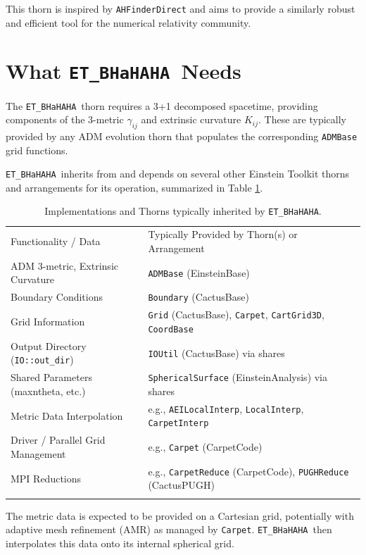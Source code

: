 \documentclass[a4paper,11pt]{article}
\newcommand{\thorn}[1]{{\tt #1}}
\newcommand{\arrangement}[1]{{\sc #1}}
\newcommand{\BHaHAHA}{\thorn{ET\_BHaHAHA}} %
\begin{document}
This thorn is inspired by \thorn{AHFinderDirect} \cite{Thornburg04AHF, Thornburg07LR} and aims to provide a similarly robust and efficient tool for the numerical relativity community.

\section{What \BHaHAHA\ Needs}
\label{sec:needs}

The \BHaHAHA\ thorn requires a 3+1 decomposed spacetime, providing components of the 3-metric $\gamma_{ij}$ and extrinsic curvature $K_{ij}$. These are typically provided by any ADM evolution thorn that populates the corresponding \thorn{ADMBase} grid functions.

\BHaHAHA\ inherits from and depends on several other Einstein Toolkit thorns and arrangements for its operation, summarized in Table \ref{tab:inherits_needs}.
\begin{table}[htbp]
\centering
\caption[Thorns and capabilities typically required by \BHaHAHA.]
         {Implementations and Thorns typically inherited by \BHaHAHA.}
\label{tab:inherits_needs}
\vspace{0.5em}
\begin{tabular}{ll}
\hfill
Functionality / Data           & Typically Provided by Thorn(s) or Arrangement \\
\hfill
ADM 3-metric, Extrinsic Curvature & \thorn{ADMBase} (\arrangement{EinsteinBase}) \\
Boundary Conditions                & \thorn{Boundary} (\arrangement{CactusBase}) \\
Grid Information                   & \thorn{Grid} (\arrangement{CactusBase}), \thorn{Carpet}, \thorn{CartGrid3D}, \thorn{CoordBase} \\
Output Directory (\texttt{IO::out\_dir})  & \thorn{IOUtil} (\arrangement{CactusBase}) via shares \\
Shared Parameters (maxntheta, etc.)& \thorn{SphericalSurface} (\arrangement{EinsteinAnalysis}) via shares \\
Metric Data Interpolation        & e.g., \thorn{AEILocalInterp}, \thorn{LocalInterp}, \thorn{CarpetInterp} \\
Driver / Parallel Grid Management  & e.g., \thorn{Carpet} (\arrangement{CarpetCode}) \\
MPI Reductions                     & e.g., \thorn{CarpetReduce} (\arrangement{CarpetCode}), \thorn{PUGHReduce} (\arrangement{CactusPUGH}) \\
\hfill
\end{tabular}
\end{table}
The metric data is expected to be provided on a Cartesian grid, potentially with adaptive mesh refinement (AMR) as managed by \thorn{Carpet}. \BHaHAHA\ then interpolates this data onto its internal spherical grid.
\end{document}
